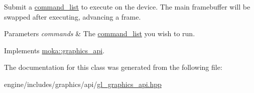 Submit a \mbox{\hyperlink{classmoka_1_1command__list}{command\+\_\+list}} to execute on the device. The main framebuffer will be swapped after executing, advancing a frame. 


\begin{DoxyParams}{Parameters}
{\em commands} & The \mbox{\hyperlink{classmoka_1_1command__list}{command\+\_\+list}} you wish to run. \\
\hline
\end{DoxyParams}


Implements \mbox{\hyperlink{classmoka_1_1graphics__api_a2b839d3a34c4eb88b0587e40f0616af3}{moka\+::graphics\+\_\+api}}.



The documentation for this class was generated from the following file\+:\begin{DoxyCompactItemize}
\item 
engine/includes/graphics/api/\mbox{\hyperlink{gl__graphics__api_8hpp}{gl\+\_\+graphics\+\_\+api.\+hpp}}\end{DoxyCompactItemize}
